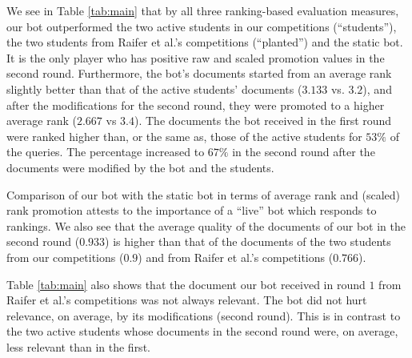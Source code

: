 We see in Table \ref{tab:main} that by all three ranking-based 
evaluation measures, our bot outperformed the two active students in our competitions (``students''), the two students from Raifer et al.'s competitions (``planted'') and the static bot. It is the only player who
has positive raw and scaled promotion values in the second round. Furthermore, 
the bot's documents started from an average rank slightly better than
that of the active students' documents ($3.133$ vs.  $3.2$), and after the modifications for the second round, they were
promoted to a higher average rank ($2.667$ vs $3.4$). The documents the bot received in the first round were ranked higher than, or the same as,  those of the active students for $53\%$ of the queries. The percentage increased to $67\%$ in the second round after the documents were modified by the bot and the students.

Comparison of our bot with the static bot in terms of average rank and
(scaled) rank promotion attests to the importance of a ``live''
bot which responds to rankings. We also see that the average quality of the documents of our bot in the second round ($0.933$) is higher
than that of the documents of the two students from our
competitions ($0.9$) and from Raifer et al.'s competitions ($0.766$).

Table \ref{tab:main} also shows that the document our bot
received in round $1$ from Raifer et al.'s competitions was not always
relevant. The bot did not hurt relevance, on average, by its modifications (second round). This is in contrast to the two active students whose documents in the second round
were, on average, less relevant than in the first.





